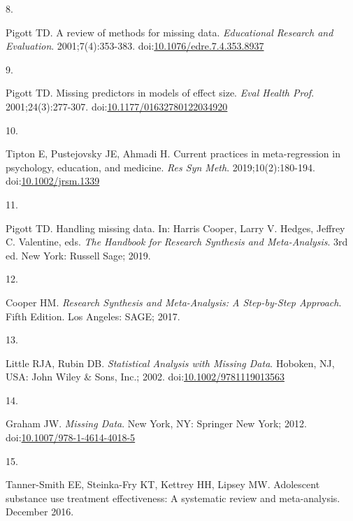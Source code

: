 \documentclass[
]{article}
\newlength{\cslhangindent}
\newlength{\csllabelwidth}
\newlength{\cslentryspacingunit} %
\newenvironment{CSLReferences}[2] %
 {%
  \setlength{\parindent}{0pt}
  \ifodd #1
  \let\oldpar\par
  \def\par{\hangindent=\cslhangindent\oldpar}
  \fi
  \setlength{\parskip}{#2\cslentryspacingunit}
 }%
 {}
\newcommand{\CSLLeftMargin}[1]{\parbox[t]{\csllabelwidth}{#1}}
\newcommand{\CSLRightInline}[1]{\parbox[t]{\linewidth - \csllabelwidth}{#1}\break}
\begin{document}
\begin{CSLReferences}{0}{0}
\leavevmode{}%
\CSLLeftMargin{8. }
\CSLRightInline{Pigott TD. A review of methods for missing data. \emph{Educational Research and Evaluation}. 2001;7(4):353-383. doi:\href{https://doi.org/10.1076/edre.7.4.353.8937}{10.1076/edre.7.4.353.8937}}

\leavevmode{}%
\CSLLeftMargin{9. }
\CSLRightInline{Pigott TD. Missing predictors in models of effect size. \emph{Eval Health Prof}. 2001;24(3):277-307. doi:\href{https://doi.org/10.1177/01632780122034920}{10.1177/01632780122034920}}

\leavevmode{}%
\CSLLeftMargin{10. }
\CSLRightInline{Tipton E, Pustejovsky JE, Ahmadi H. Current practices in meta-regression in psychology, education, and medicine. \emph{Res Syn Meth}. 2019;10(2):180-194. doi:\href{https://doi.org/10.1002/jrsm.1339}{10.1002/jrsm.1339}}

\leavevmode{}%
\CSLLeftMargin{11. }
\CSLRightInline{Pigott TD. Handling missing data. In: Harris Cooper, Larry V. Hedges, Jeffrey C. Valentine, eds. \emph{The Handbook for Research Synthesis and Meta-Analysis}. 3rd ed. New York: Russell Sage; 2019.}

\leavevmode{}%
\CSLLeftMargin{12. }
\CSLRightInline{Cooper HM. \emph{Research Synthesis and Meta-Analysis: A Step-by-Step Approach}. Fifth Edition. Los Angeles: SAGE; 2017.}

\leavevmode{}%
\CSLLeftMargin{13. }
\CSLRightInline{Little RJA, Rubin DB. \emph{Statistical Analysis with Missing Data}. Hoboken, NJ, USA: John Wiley \& Sons, Inc.; 2002. doi:\href{https://doi.org/10.1002/9781119013563}{10.1002/9781119013563}}

\leavevmode{}%
\CSLLeftMargin{14. }
\CSLRightInline{Graham JW. \emph{Missing Data}. New York, NY: Springer New York; 2012. doi:\href{https://doi.org/10.1007/978-1-4614-4018-5}{10.1007/978-1-4614-4018-5}}

\leavevmode{}%
\CSLLeftMargin{15. }
\CSLRightInline{Tanner-Smith EE, Steinka-Fry KT, Kettrey HH, Lipsey MW. Adolescent substance use treatment effectiveness: A systematic review and meta-analysis. December 2016.}


\end{CSLReferences}
\end{document}
